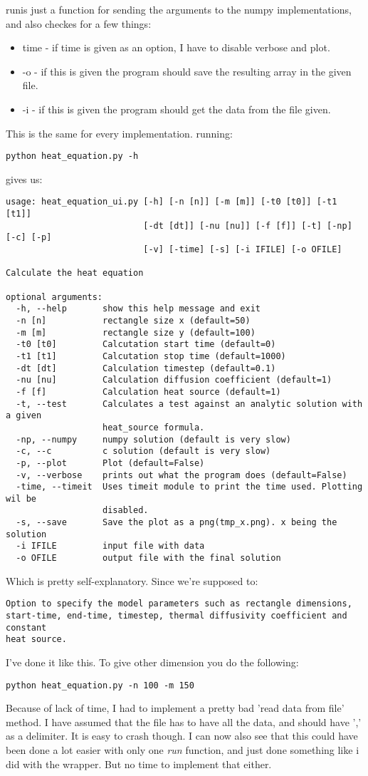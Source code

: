 \documentclass[a4paper]{article}
\begin{document}
run\textunderscorenumpy is just a function for sending the arguments to the numpy implementations, and also checkes for a few things:
\begin{itemize}
\item time - if time is given as an option, I have to disable verbose and plot. 
\item -o - if this is given the program should save the resulting array in the given file. 
\item -i - if this is given the program should get the data from the file given.
\end{itemize}
This is the same for every implementation.
running:
\begin{verbatim}
python heat_equation.py -h
\end{verbatim}
gives us:
\begin{verbatim}
usage: heat_equation_ui.py [-h] [-n [n]] [-m [m]] [-t0 [t0]] [-t1 [t1]]
                           [-dt [dt]] [-nu [nu]] [-f [f]] [-t] [-np] [-c] [-p]
                           [-v] [-time] [-s] [-i IFILE] [-o OFILE]

Calculate the heat equation

optional arguments:
  -h, --help       show this help message and exit
  -n [n]           rectangle size x (default=50)
  -m [m]           rectangle size y (default=100)
  -t0 [t0]         Calcutation start time (default=0)
  -t1 [t1]         Calcutation stop time (default=1000)
  -dt [dt]         Calculation timestep (default=0.1)
  -nu [nu]         Calculation diffusion coefficient (default=1)
  -f [f]           Calculation heat source (default=1)
  -t, --test       Calculates a test against an analytic solution with a given
                   heat_source formula.
  -np, --numpy     numpy solution (default is very slow)
  -c, --c          c solution (default is very slow)
  -p, --plot       Plot (default=False)
  -v, --verbose    prints out what the program does (default=False)
  -time, --timeit  Uses timeit module to print the time used. Plotting wil be
                   disabled.
  -s, --save       Save the plot as a png(tmp_x.png). x being the solution
  -i IFILE         input file with data
  -o OFILE         output file with the final solution

\end{verbatim}
Which is pretty self-explanatory. Since we're supposed to:
\begin{verbatim}
Option to specify the model parameters such as rectangle dimensions,
start-time, end-time, timestep, thermal diffusivity coefficient and constant
heat source.
\end{verbatim}
I've done it like this. To give other dimension you do the following:
\begin{verbatim}
python heat_equation.py -n 100 -m 150 
\end{verbatim}
Because of lack of time, I had to implement a pretty bad 'read data from file' method. I have assumed that the file has to have all the data, and should have ',' as a delimiter. It is easy to crash though.
I can now also see that this could have been done a lot easier with only one \emph{run\textunderscoreX} function, and just done something like i did with the wrapper. But no time to implement that either.
\end{document}
